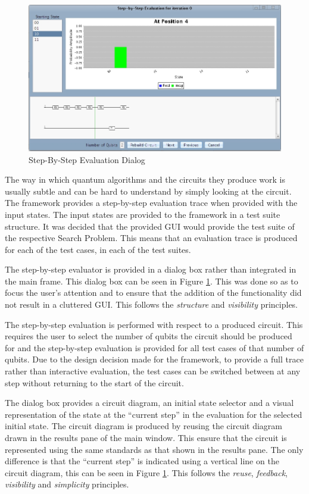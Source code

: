 \begin{figure}
 \includegraphics[width=\textwidth]{StepByStepEval.jpg}
\caption{Step-By-Step Evaluation Dialog}
\label{fig:StepByStepEval}
\end{figure}
The way in which quantum algorithms and the circuits they produce work is usually subtle and can be hard to understand by simply looking at the circuit.
The framework provides a step-by-step evaluation trace when provided with the input states.
The input states are provided to the framework in a test suite structure.
It was decided that the provided GUI would provide the test suite of the respective Search Problem.
This means that an evaluation trace is produced for each of the test cases, in each of the test suites.

The step-by-step evaluator is provided in a dialog box rather than integrated in the main frame.
This dialog box can be seen in Figure \ref{fig:StepByStepEval}.
This was done so as to focus the user's attention and to ensure that the addition of the functionality did not result in a cluttered GUI.
This follows the \emph{structure} and \emph{visibility} principles.

The step-by-step evaluation is performed with respect to a produced circuit.
This requires the user to select the number of qubits the circuit should be produced for and the step-by-step evaluation is provided for all test cases of that number of qubits.
Due to the design decision made for the framework, to provide a full trace rather than interactive evaluation, the test cases can be switched between at any step without returning to the start of the circuit.

The dialog box provides a circuit diagram, an initial state selector and a visual representation of the state at the ``current step'' in the evaluation for the selected initial state.
The circuit diagram is produced by reusing the circuit diagram drawn in the results pane of the main window.
This ensure that the circuit is represented using the same standards as that shown in the results pane.
The only difference is that the ``current step'' is indicated using a vertical line on the circuit diagram, this can be seen in Figure \ref{fig:StepByStepEval}.
This follows the \emph{reuse}, \emph{feedback},  \emph{visibility} and \emph{simplicity} principles.

